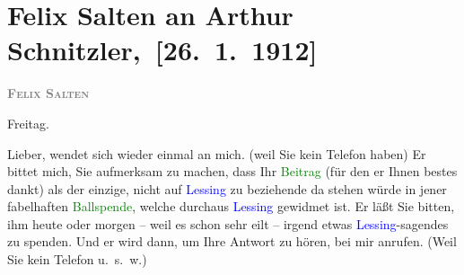 

\renewcommand{\erwaehntePersonen}{Personen: Julius Bauer, Gotthold Ephraim Lessing, Felix Salten}
\renewcommand{\erwaehnteInstitutionen}{Institutionen: Concordia}
\renewcommand{\erwaehnteOrte}{Orte: Wien}
\renewcommand{\erwaehnteWerke}{Werke: Lessing Almanach, [Um einer Partei anzugehören]}
\section[ Felix Salten an Arthur Schnitzler, {[}26. 1. 1912{]}]{Felix Salten an Arthur Schnitzler, {[}26. 1. 1912{]}}
\nopagebreak{}
\rehead{ }\normalsize\beginnumbering{}
\toendnotes[C]{\smallbreak\pagebreak[2]}
\toendnotes[C]{\smallbreak}
\pstart
           \noindent{}\centering{}{\pb}\textcolor{gray}{\textbf{\textsc{Felix Salten}}}\pend
           
\pstart
           \raggedleft{}Freitag.\pend
           
\pstart{}Lieber,\pend
\pstart
           \label{K_L03555-1v}\label{K_L03555-1h} wendet sich wieder einmal
               an mich. (weil Sie kein Telefon haben) Er bittet mich, Sie aufmerksam zu machen, dass
               Ihr \textcolor{green}{Beitrag}{}\ledrightnote{{$\rightarrow$}\textcolor{green}{[Um einer Partei anzugehören]}} (für den er Ihnen
               bestes dankt) \introOben{}als\introOben{} der einzige, nicht auf \textcolor{blue}{Lessing}{}\ledrightnote{\textcolor{blue}{Gotthold Ephraim Lessing}} zu beziehende da stehen würde in jener fabelhaften
                  \textcolor{green}{Ballspende}{}\ledrightnote{{$\rightarrow$}\textcolor{green}{Lessing Almanach}}, welche durchaus
                  \textcolor{blue}{Lessing}{}\ledrightnote{\textcolor{blue}{Gotthold Ephraim Lessing}} gewidmet ist. Er läßt Sie bitten,
               ihm heute oder morgen –
               weil es schon sehr eilt – irgend etwas \textcolor{blue}{Lessing}{}\ledrightnote{\textcolor{blue}{Gotthold Ephraim Lessing}}-sagendes zu spenden. Und er wird dann, um Ihre Antwort zu hören, bei
               mir anrufen. (Weil Sie kein Telefon u. s. w.)\pend
           
